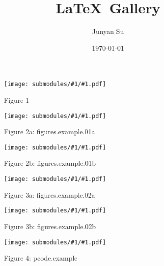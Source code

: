 \documentclass{article}
\title{\LaTeX\, Gallery}
\author{Junyan Su}
\date{\today}
\begin{document}
\maketitle

\newcommand{\includeSubmodule}[2]{
    \begin{figure}[ht]
        \begin{center}
            \texttt{[image: submodules/\#1/\#1.pdf]}
        \end{center} 
        \caption*{Figure #1#2}
    \end{figure}
}
\includeSubmodule{1}{}
\includeSubmodule{2a}{: figures.example.01a}
\includeSubmodule{2b}{: figures.example.01b}
\includeSubmodule{3a}{: figures.example.02a}
\includeSubmodule{3b}{: figures.example.02b}
\includeSubmodule{4}{: pcode.example}



%
%
\end{document}
